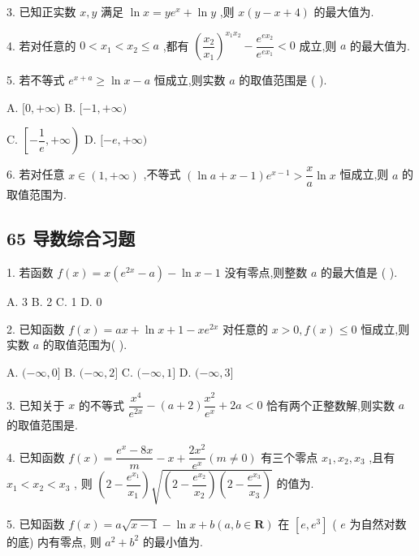 3. 已知正实数 $x,y$ 满足 $\ln x = y{{e}}^{x} + \ln y$ ,则 $x\left( {y - x + 4}\right)$ 的最大值为\blkda{}.

4. 若对任意的 $0 < {x}_{1} < {x}_{2} \leq  a$ ,都有 ${\left( \dfrac{{x}_{2}}{{x}_{1}}\right) }^{{x}_{1}{x}_{2}} - \dfrac{{{e}}^{e{x}_{2}}}{{{e}}^{e{x}_{1}}} < 0$ 成立,则 $a$ 的最大值为\blkda{}.

5. 若不等式 ${{e}}^{x + a} \geq  \ln x - a$ 恒成立,则实数 $a$ 的取值范围是 (   ).

A. $\lbrack 0, + \infty )$ B. $\lbrack  - 1, + \infty )$

C. $\left\lbrack  {-\dfrac{1}{{e}}, + \infty }\right)$ D. $\lbrack  - {e}, + \infty )$

6. 若对任意 $x \in  \left( {1, + \infty }\right)$ ,不等式 $\left( {\ln a + x - 1}\right) {{e}}^{x - 1} > \dfrac{x}{a}\ln x$ 恒成立,则 $a$ 的取值范围为\blkda{}.

\subsection*{65 导数综合习题}

1. 若函数 $f\left( x\right)  = x\left( {{{e}}^{2x} - a}\right)  - \ln x - 1$ 没有零点,则整数 $a$ 的最大值是 (   ).

A. 3 B. 2 C. 1 D. 0

2. 已知函数 $f\left( x\right)  = {ax} + \ln x + 1 - x{{e}}^{2x}$ 对任意的 $x > 0,f\left( x\right)  \leq  0$ 恒成立,则实数 $a$ 的取值范围为(   ).

A. $( - \infty ,0\rbrack$ B. $( - \infty ,2\rbrack$ C. $( - \infty ,1\rbrack$ D. $( - \infty ,3\rbrack$

3. 已知关于 $x$ 的不等式 $\dfrac{{x}^{4}}{{{e}}^{2x}} - \left( {a + 2}\right) \dfrac{{x}^{2}}{{{e}}^{x}} + {2a} < 0$ 恰有两个正整数解,则实数 $a$ 的取值范围是\blkda{}.

4. 已知函数 $f\left( x\right)  = \dfrac{{{e}}^{x} - {8x}}{m} - x + \dfrac{2{x}^{2}}{{{e}}^{x}}\left( {m \neq  0}\right)$ 有三个零点 ${x}_{1},{x}_{2},{x}_{3}$ ,且有 ${x}_{1} < {x}_{2} < {x}_{3}$ , 则 $\left( {2 - \dfrac{{{e}}^{{x}_{1}}}{{x}_{1}}}\right) \sqrt{\left( {2 - \dfrac{{{e}}^{{x}_{2}}}{{x}_{2}}}\right) \left( {2 - \dfrac{{{e}}^{{x}_{3}}}{{x}_{3}}}\right) }$ 的值为\blkda{}.

5. 已知函数 $f\left( x\right)  = a\sqrt{x - 1} - \ln x + b\left( {a,b \in  \mathbf{R}}\right)$ 在 $\left\lbrack  {{e},{{e}}^{3}}\right\rbrack$ ( ${e}$ 为自然对数的底) 内有零点, 则 ${a}^{2} + {b}^{2}$ 的最小值为\blkda{}.

